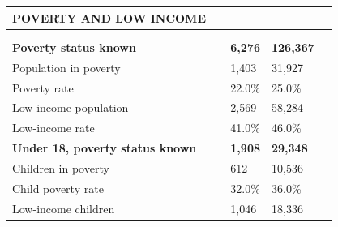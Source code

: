 \documentclass[9pt]{report}
\begin{document}
\vspace{12pt}
\setlength{\tabcolsep}{.01in} %
\begin{tabular}{p{.10in}p{.10in}p{.10in}p{3.7in}>{\hfill}p{.85in}>{\hfill}p{.85in}>{\hfill}p{.85in}>{\hfill}p{.85in}p{0.1in}}
\multicolumn{9}{l}{\parbox{7.1in}{\raggedright{\large{\strut\textbf{POVERTY AND LOW INCOME}\strut}}}} \\ 
\hline
\multicolumn{4}{l}{\parbox{3.5in}{\raggedright{\textbf{}}}} & \multicolumn{1}{r}{\parbox{.85in}{\strut\raggedleft{\textbf{}\strut}}} & \multicolumn{1}{r}{\parbox{.85in}{\strut\raggedleft{\textbf{}\strut}}} & \multicolumn{1}{r}{\parbox{.85in}{\strut{}}} & \multicolumn{1}{r}{\parbox{.85in}{\strut{}}} & \\ 
\multicolumn{9}{l}{} \\ 
\multicolumn{4}{l}{\parbox{3.5in}{\strut\raggedright{\textbf{Poverty status known}\strut}}} & \textbf{} & \textbf{} & \textbf{6,276} & \textbf{126,367} & \textbf{} \\ 
\multicolumn{4}{l}{\parbox{3.6in}{\strut\raggedright{{Population in poverty}}\strut}} &  &  & 1,403 & 31,927 & \multicolumn{1}{l}{}  \\ 
\multicolumn{4}{l}{\parbox{3.6in}{\strut\raggedright{{Poverty rate}}\strut}} &  &  & 22.0\% & 25.0\% & \multicolumn{1}{l}{}  \\ 
\multicolumn{4}{l}{\parbox{3.6in}{\strut\raggedright{{Low-income population}}\strut}} &  &  & 2,569 & 58,284 & \multicolumn{1}{l}{}  \\ 
\multicolumn{4}{l}{\parbox{3.6in}{\strut\raggedright{{Low-income rate}}\strut}} &  &  & 41.0\% & 46.0\% & \multicolumn{1}{l}{}  \\ 
\multicolumn{4}{l}{\parbox{3.5in}{\strut\raggedright{\textbf{Under 18, poverty status known}\strut}}} & \textbf{} & \textbf{} & \textbf{1,908} & \textbf{29,348} & \textbf{} \\ 
\multicolumn{4}{l}{\parbox{3.6in}{\strut\raggedright{{Children in poverty}}\strut}} &  &  & 612 & 10,536 & \multicolumn{1}{l}{}  \\ 
\multicolumn{4}{l}{\parbox{3.6in}{\strut\raggedright{{Child poverty rate}}\strut}} &  &  & 32.0\% & 36.0\% & \multicolumn{1}{l}{}  \\ 
\multicolumn{4}{l}{\parbox{3.6in}{\strut\raggedright{{Low-income children}}\strut}} &  &  & 1,046 & 18,336 & \multicolumn{1}{l}{}  \\ 

\end{tabular}
\end{document}
